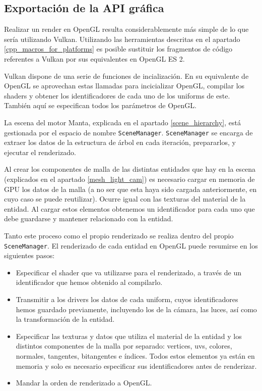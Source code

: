 
\subsection{Exportación de la API gráfica}
Realizar un render en OpenGL resulta considerablemente más simple de lo que sería utilizando Vulkan. Utilizando las herramientas descritas en el apartado \ref{cpp_macros_for_platforms} es posible sustituir los fragmentos de código referentes a Vulkan por sus equivalentes en OpenGL ES 2.

Vulkan dispone de una serie de funciones de incialización. En su equivalente de OpenGL se aprovechan estas llamadas para incicializar OpenGL, compilar los shaders y obtener los identificadores de cada uno de los uniforms de este. También aquí se especifican todos los parámetros de OpenGL.

La escena del motor Manta, explicada en el apartado \ref{scene_hierarchy}, está gestionada por el espacio de nombre \texttt{SceneManager}. \texttt{SceneManager} se encarga de extraer los datos de la estructura de árbol en cada iteración, prepararlos, y ejecutar el renderizado. 

Al crear los componentes de malla de las distintas entidades que hay en la escena (explicados en el apartado \ref{mesh_light_cam}) es necesario cargar en memoria de GPU los datos de la malla (a no ser que esta haya sido cargada anteriormente, en cuyo caso se puede reutilizar). Ocurre igual con las texturas del material de la entidad. Al cargar estos elementos obtenemos un identificador para cada uno que debe guardarse y mantener relacionado con la entidad. 

Tanto este proceso como el propio renderizado se realiza dentro del propio \texttt{SceneManager}. El renderizado de cada entidad en OpenGL puede resumirse en los siguientes pasos:

\begin{itemize}
    \item Especificar el shader que va utilizarse para el renderizado, a través de un identificador que hemos obtenido al compilarlo.
    \item Transmitir a los drivers los datos de cada uniform, cuyos identificadores hemos guardado previamente, incluyendo los de la cámara, las luces, así como la transformación de la entidad.
    \item Especificar las texturas y datos que utiliza el material de la entidad y los distintos componentes de la malla por separado: vertices, uvs, colores, normales, tangentes, bitangentes e índices. Todos estos elementos ya están en memoria y solo es necesario especificar sus identificadores antes de renderizar.
    \item Mandar la orden de renderizado a OpenGL.
\end{itemize}

